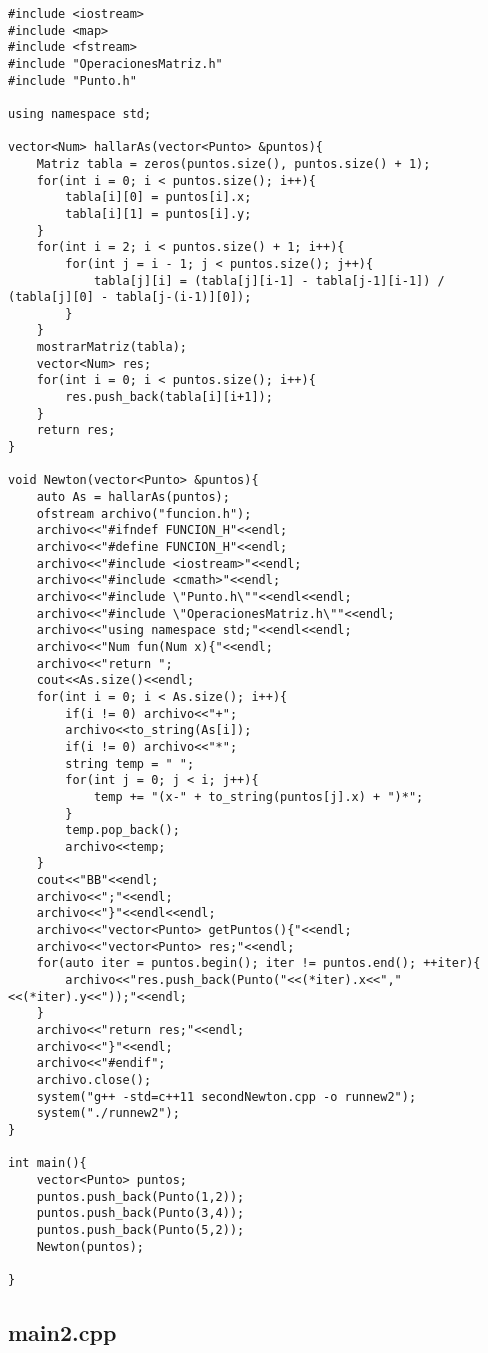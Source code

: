 \documentclass[a4paper,12pt]{article}
\begin{document}
\begin{lstlisting}
#include <iostream>
#include <map>
#include <fstream>
#include "OperacionesMatriz.h"
#include "Punto.h"

using namespace std;

vector<Num> hallarAs(vector<Punto> &puntos){
	Matriz tabla = zeros(puntos.size(), puntos.size() + 1);
	for(int i = 0; i < puntos.size(); i++){
		tabla[i][0] = puntos[i].x;
		tabla[i][1] = puntos[i].y;
	}
	for(int i = 2; i < puntos.size() + 1; i++){
		for(int j = i - 1; j < puntos.size(); j++){
			tabla[j][i] = (tabla[j][i-1] - tabla[j-1][i-1]) / (tabla[j][0] - tabla[j-(i-1)][0]);
		}
	}
	mostrarMatriz(tabla);
	vector<Num> res; 
	for(int i = 0; i < puntos.size(); i++){
		res.push_back(tabla[i][i+1]);
	}
	return res;
}

void Newton(vector<Punto> &puntos){
	auto As = hallarAs(puntos);
	ofstream archivo("funcion.h");
	archivo<<"#ifndef FUNCION_H"<<endl;
	archivo<<"#define FUNCION_H"<<endl;
	archivo<<"#include <iostream>"<<endl;
	archivo<<"#include <cmath>"<<endl;
	archivo<<"#include \"Punto.h\""<<endl<<endl;
	archivo<<"#include \"OperacionesMatriz.h\""<<endl;
	archivo<<"using namespace std;"<<endl<<endl;
	archivo<<"Num fun(Num x){"<<endl;
	archivo<<"return ";
	cout<<As.size()<<endl;
	for(int i = 0; i < As.size(); i++){
		if(i != 0) archivo<<"+";
		archivo<<to_string(As[i]);
		if(i != 0) archivo<<"*";
		string temp = " ";
		for(int j = 0; j < i; j++){
			temp += "(x-" + to_string(puntos[j].x) + ")*";
		}
		temp.pop_back();
		archivo<<temp;
	}
	cout<<"BB"<<endl;
	archivo<<";"<<endl;
	archivo<<"}"<<endl<<endl;
	archivo<<"vector<Punto> getPuntos(){"<<endl;
	archivo<<"vector<Punto> res;"<<endl;
	for(auto iter = puntos.begin(); iter != puntos.end(); ++iter){
		archivo<<"res.push_back(Punto("<<(*iter).x<<","<<(*iter).y<<"));"<<endl;
	}
	archivo<<"return res;"<<endl;
	archivo<<"}"<<endl;
	archivo<<"#endif";
	archivo.close();
	system("g++ -std=c++11 secondNewton.cpp -o runnew2");
	system("./runnew2");
}

int main(){
	vector<Punto> puntos;
	puntos.push_back(Punto(1,2));
	puntos.push_back(Punto(3,4));
	puntos.push_back(Punto(5,2));
	Newton(puntos);

}

\end{lstlisting}

\subsection{main2.cpp}
\end{document}
